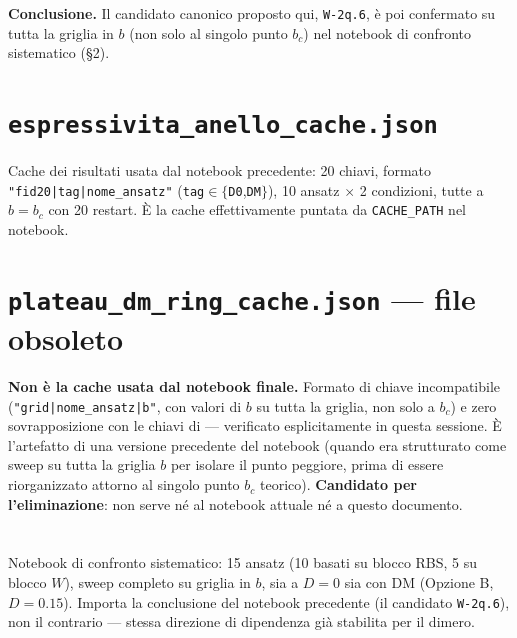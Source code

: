 \documentclass[11pt,a4paper]{article}
\begin{document}
\textbf{Conclusione.} Il candidato canonico proposto qui, \texttt{W-2q.6}, è poi
confermato su tutta la griglia in $b$ (non solo al singolo punto $b_c$) nel
notebook di confronto sistematico (§2).

\section*{\texttt{espressivita\_anello\_cache.json}}

Cache dei risultati usata dal notebook precedente: 20 chiavi, formato
\texttt{"fid20|tag|nome\_ansatz"} (\texttt{tag}$\in\{$\texttt{D0},\texttt{DM}$\}$),
10 ansatz $\times$ 2 condizioni, tutte a $b=b_c$ con 20 restart. È la cache
effettivamente puntata da \texttt{CACHE\_PATH} nel notebook.

\section*{\texttt{plateau\_dm\_ring\_cache.json} — file obsoleto}

\textbf{Non è la cache usata dal notebook finale.} Formato di chiave incompatibile
(\texttt{"grid|nome\_ansatz|b"}, con valori di $b$ su tutta la griglia, non solo a
$b_c$) e zero sovrapposizione con le chiavi di
\texttt{} — verificato esplicitamente in
questa sessione. È l'artefatto di una versione precedente del notebook (quando era
strutturato come sweep su tutta la griglia $b$ per isolare il punto peggiore,
prima di essere riorganizzato attorno al singolo punto $b_c$ teorico).
\textbf{Candidato per l'eliminazione}: non serve né al notebook attuale né a questo
documento.

\section*{\texttt{}}

Notebook di confronto sistematico: 15 ansatz (10 basati su blocco RBS, 5 su blocco
$W$), sweep completo su griglia in $b$, sia a $D=0$ sia con DM (Opzione B,
$D=0.15$). Importa la conclusione del notebook precedente (il candidato
\texttt{W-2q.6}), non il contrario — stessa direzione di dipendenza già stabilita
per il dimero.
\end{document}
